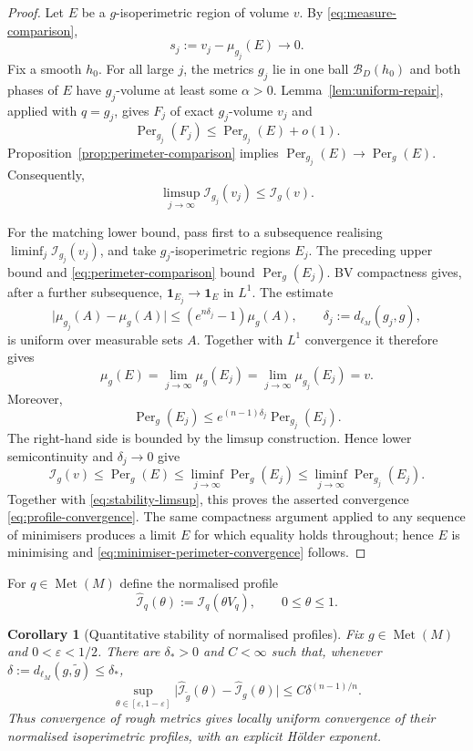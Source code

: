 \documentclass[11pt]{amsart}
\newtheorem{corollary}[theorem]{Corollary}
\theoremstyle{definition}
\theoremstyle{remark}
\newcommand{\Met}{\operatorname{Met}}
\newcommand{\dMet}{d_{\ell_M}}
\newcommand{\Per}{\operatorname{Per}}
\newcommand{\one}{\mathbf 1}
\newcommand{\cI}{\mathcal I}
\begin{document}
\begin{proof}
Let $E$ be a $g$-isoperimetric region of volume $v$.  By
\eqref{eq:measure-comparison},
\[
 s_j:=v_j-\mu_{g_j}(E)\longrightarrow0.
\]
Fix a smooth $h_0$.  For all large $j$, the metrics $g_j$ lie in one ball
$\mathcal B_D(h_0)$ and both phases of $E$ have $g_j$-volume at least some
$\alpha>0$.  Lemma~\ref{lem:uniform-repair}, applied with $q=g_j$, gives
$F_j$ of exact $g_j$-volume $v_j$ and
\[
 \Per_{g_j}(F_j)\leq\Per_{g_j}(E)+o(1).
\]
Proposition~\ref{prop:perimeter-comparison} implies
$\Per_{g_j}(E)\to\Per_g(E)$.  Consequently,
\begin{equation}\label{eq:stability-limsup}
 \limsup_{j\to\infty}\cI_{g_j}(v_j)\leq\cI_g(v).
\end{equation}

For the matching lower bound, pass first to a subsequence realising
$\liminf_j\cI_{g_j}(v_j)$, and take $g_j$-isoperimetric regions $E_j$.  The
preceding upper bound and \eqref{eq:perimeter-comparison} bound
$\Per_g(E_j)$.  BV compactness gives, after a further subsequence,
$\one_{E_j}\to\one_E$ in $L^1$.  The estimate
\[
 \bigl|\mu_{g_j}(A)-\mu_g(A)\bigr|
 \leq (e^{n\delta_j}-1)\mu_g(A),
 \qquad \delta_j:=\dMet(g_j,g),
\]
is uniform over measurable sets $A$.  Together with $L^1$ convergence it
therefore gives
\[
 \mu_g(E)=\lim_{j\to\infty}\mu_g(E_j)
 =\lim_{j\to\infty}\mu_{g_j}(E_j)=v.
\]
Moreover,
\[
 \Per_g(E_j)\leq e^{(n-1)\delta_j}\Per_{g_j}(E_j).
\]
The right-hand side is bounded by the limsup construction.  Hence lower
semicontinuity and $\delta_j\to0$ give
\[
 \cI_g(v)\leq\Per_g(E)
 \leq\liminf_{j\to\infty}\Per_g(E_j)
 \leq\liminf_{j\to\infty}\Per_{g_j}(E_j).
\]
Together with \eqref{eq:stability-limsup}, this proves the asserted convergence
\eqref{eq:profile-convergence}.  The same compactness argument applied to any
sequence of minimisers produces a limit $E$ for which equality holds
throughout; hence $E$ is minimising and
\eqref{eq:minimiser-perimeter-convergence} follows.
\end{proof}

For $q\in\Met(M)$ define the normalised profile
\[
 \widehat{\cI}_q(\theta):=\cI_q(\theta V_q),
 \qquad 0\leq\theta\leq1.
\]

\begin{corollary}[Quantitative stability of normalised profiles]
\label{cor:normalized-profile-holder}
Fix $g\in\Met(M)$ and $0<\varepsilon<1/2$.  There are
$\delta_*>0$ and $C<\infty$ such that, whenever
$\delta:=\dMet(g,\widetilde g)\leq\delta_*$,
\begin{equation}\label{eq:normalized-profile-holder}
 \sup_{\theta\in[\varepsilon,1-\varepsilon]}
 \bigl|\widehat{\cI}_{\widetilde g}(\theta)
       -\widehat{\cI}_g(\theta)\bigr|
 \leq C\delta^{(n-1)/n}.
\end{equation}
Thus convergence of rough metrics gives locally uniform convergence of their
normalised isoperimetric profiles, with an explicit H\"older exponent.
\end{corollary}
\end{document}
